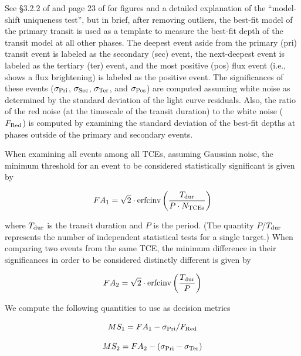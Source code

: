 See \S3.2.2 of \citet{Rowe2015a} and page 23 of \citet{Coughlin2017b} for figures and a detailed explanation of the ``model-shift uniqueness test'', but in brief, after removing outliers, the best-fit model of the primary transit is used as a template to measure the best-fit depth of the transit model at all other phases. The deepest event aside from the primary (pri) transit event is labeled as the secondary (sec) event, the next-deepest event is labeled as the tertiary (ter) event, and the most positive (pos) flux event (i.e., shows a flux brightening) is labeled as the positive event. The significances of these events ($\sigma_{\rm Pri}$, $\sigma_{\rm Sec}$, $\sigma_{\rm Ter}$, and $\sigma_{\rm Pos}$) are computed assuming white noise as determined by the standard deviation of the light curve residuals. Also, the ratio of the red noise (at the timescale of the transit duration) to the white noise ($F_{\rm Red}$) is computed by examining the standard deviation of the best-fit depths at phases outside of the primary and secondary events.  

When examining all events among all TCEs, assuming Gaussian noise, the minimum threshold for an event to be considered statistically significant is given by

\begin{equation}
    FA_{1} = \sqrt{2}\cdot \textrm{erfcinv}\left(\frac{T_{\rm dur}}{P \cdot N_{\rm TCEs}}\right)
\end{equation}

\noindent where $T_{\rm dur}$ is the transit duration and $P$ is the period. (The quantity $P$/$T_{\rm dur}$ represents the number of independent statistical tests for a single target.) When comparing two events from the same TCE, the minimum difference in their significances in order to be considered distinctly different is given by

\begin{equation}
    FA_{2} = \sqrt{2}\cdot \textrm{erfcinv}\left(\frac{T_{\rm dur}}{P}\right)
\end{equation}

\noindent We compute the following quantities to use as decision metrics

\begin{equation}
    MS_{1} = FA_{1} - \sigma_{\rm Pri}/F_{\rm Red}
\end{equation}

\begin{equation}
    MS_{2} = FA_{2} - (\sigma_{\rm Pri} - \sigma_{\rm Ter})
\end{equation}

